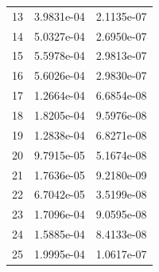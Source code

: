 \documentclass[t, pdftex]{beamer}
\begin{document}
\begin{frame}
\begin{columns}
\begin{column}{0.5\textwidth}
\begin{table}[h]
\begin{center}
\begin{tabular}[h]{|c|C|C|}
                    13 & 3.9831e-04 &  2.1135e-07  \\
                    14 & 5.0327e-04 &  2.6950e-07  \\
                    15 & 5.5978e-04 &  2.9813e-07  \\
                    16 & 5.6026e-04 &  2.9830e-07  \\
                    17 & 1.2664e-04 &  6.6854e-08  \\
                    18 & 1.8205e-04 &  9.5976e-08  \\
                    19 & 1.2838e-04 &  6.8271e-08  \\
                    20 & 9.7915e-05 &  5.1674e-08  \\
                    21 & 1.7636e-05 &  9.2180e-09  \\
                    22 & 6.7042e-05 &  3.5199e-08  \\
                    23 & 1.7096e-04 &  9.0595e-08  \\
                    24 & 1.5885e-04 &  8.4133e-08  \\
                    25 & 1.9995e-04 &  1.0617e-07  \\
                    \hline
                \end{tabular}
                \label{tab:loo_rms}
            \end{center}
        \end{table}
    \end{column}
\end{columns}
\end{frame}
\end{document}
